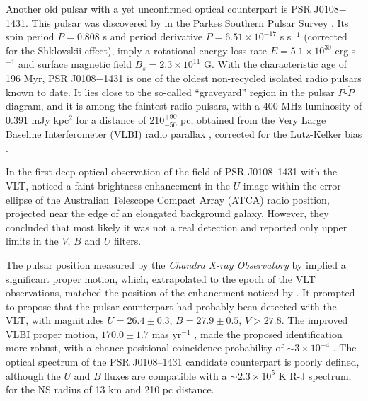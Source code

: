 \documentclass[pdftex,twocolumn]{aastex62}
\begin{document}
Another old pulsar with a yet unconfirmed optical counterpart is PSR J0108$-$1431. %
This pulsar was discovered by \citet{1994tauris} %
in the Parkes Southern Pulsar Survey \citep{1996manch}.  
Its spin period $P = 0.808$ s and period derivative
$\dot{P} = 
6.51\times  10^{-17}$ s s$^{-1}$ 
(corrected for the Shklovskii effect), imply a rotational energy loss rate $\dot{E} = 5.1\times 10^{30}$ erg s$^{-1}$ 
and surface magnetic field $B_s = 2.3\times 10^{11}$ G. With the characteristic age of 
196 Myr, PSR J0108$-$1431 is one of the oldest non-recycled isolated radio pulsars known to date. 
It lies close to the so-called ``graveyard'' region in the pulsar $P$-$\dot{P}$ diagram, and it is among the faintest radio pulsars, with a 400 MHz luminosity of 0.391 mJy kpc$^2$ for a distance of $210^{+90}_{-50}$ pc, obtained from the Very Large Baseline Interferometer (VLBI) radio parallax \citep{Deller2009}, 
corrected for the Lutz-Kelker bias \citep{2012verbi}. 

In the first deep optical observation of the field of PSR J0108--1431 with the VLT,
\citet{Mignani2003} 
noticed a faint brightness enhancement in the $U$ image within
 the error ellipse of the Australian Telescope Compact Array (ATCA) radio position, 
projected near the edge of an elongated background galaxy. However, they concluded that most likely it was not a real detection and reported only upper limits in the $V$, $B$ and $U$ filters.

The pulsar position measured by the {\sl Chandra X-ray Observatory} 
by \citet{2009pavlov}
 implied a significant proper motion, which, extrapolated to the epoch of the VLT observations, matched the position of the 
enhancement noticed by  \citet{Mignani2003}. It prompted \citet{Mignani2008}
to propose that the pulsar counterpart had probably been detected with the VLT, with magnitudes $U=26.4\pm 0.3$, $B=27.9\pm 0.5$, $V > 27.8$.
The improved VLBI proper motion,  
$170.0\pm 1.7$ mas yr$^{-1}$ \citep{Deller2009}, made the proposed identification 
more robust, with a chance positional coincidence probability of $\sim 3\times 10^{-4}$  \citep{Mignani2011}.  
The optical spectrum of the PSR J0108--1431 candidate counterpart is poorly defined, although the $U$ and $B$ fluxes are compatible with a $\sim 2.3 \times 10^5$ K R-J spectrum, for the NS radius of 13 km and 210 pc distance. 
\end{document}
